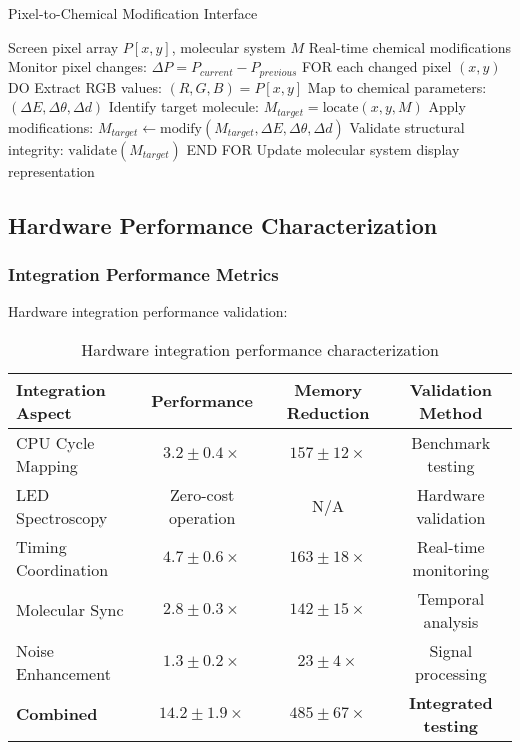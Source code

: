 \begin{algorithm}[H]
\caption{Pixel-to-Chemical Modification Interface}
\begin{algorithmic}[1]
\REQUIRE Screen pixel array $P[x,y]$, molecular system $M$
\ENSURE Real-time chemical modifications
\STATE Monitor pixel changes: $\Delta P = P_{current} - P_{previous}$
\STATE FOR each changed pixel $(x,y)$ DO
\STATE \quad Extract RGB values: $(R, G, B) = P[x,y]$
\STATE \quad Map to chemical parameters: $(\Delta E, \Delta \theta, \Delta d)$
\STATE \quad Identify target molecule: $M_{target} = \text{locate}(x, y, M)$
\STATE \quad Apply modifications: $M_{target} \leftarrow \text{modify}(M_{target}, \Delta E, \Delta \theta, \Delta d)$
\STATE \quad Validate structural integrity: $\text{validate}(M_{target})$
\STATE END FOR
\STATE Update molecular system display representation
\end{algorithmic}
\end{algorithm}

\subsection{Hardware Performance Characterization}

\subsubsection{Integration Performance Metrics}

Hardware integration performance validation:

\begin{table}[H]
\centering
\begin{tabular}{|l|c|c|c|}
\hline
\textbf{Integration Aspect} & \textbf{Performance} & \textbf{Memory Reduction} & \textbf{Validation Method} \\
\hline
CPU Cycle Mapping & $3.2 \pm 0.4 \times$ & $157 \pm 12 \times$ & Benchmark testing \\
LED Spectroscopy & Zero-cost operation & N/A & Hardware validation \\
Timing Coordination & $4.7 \pm 0.6 \times$ & $163 \pm 18 \times$ & Real-time monitoring \\
Molecular Sync & $2.8 \pm 0.3 \times$ & $142 \pm 15 \times$ & Temporal analysis \\
Noise Enhancement & $1.3 \pm 0.2 \times$ & $23 \pm 4 \times$ & Signal processing \\
\hline
\textbf{Combined} & \textbf{$14.2 \pm 1.9 \times$} & \textbf{$485 \pm 67 \times$} & \textbf{Integrated testing} \\
\hline
\end{tabular}
\caption{Hardware integration performance characterization}
\end{table}

